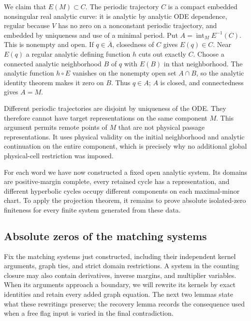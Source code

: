 We claim that $E(M)\subset C$.  The periodic trajectory $C$ is a
compact embedded nonsingular real analytic curve: it is analytic
by analytic ODE dependence, regular because $V$ has no zero on a
nonconstant periodic trajectory, and embedded by uniqueness and
use of a minimal period.  Put
$A=\operatorname{int}_M E^{-1}(C)$.  This is nonempty and open.
If $q\in\overline A$, closedness of $C$ gives $E(q)\in C$.
Near $E(q)$ a regular analytic defining function $h$ cuts out
exactly $C$.  Choose a connected analytic neighborhood $B$ of $q$
with $E(B)$ in that neighborhood.  The analytic function $h\circ E$
vanishes on the nonempty open set $A\cap B$, so the analytic
identity theorem makes it zero on $B$.  Thus $q\in A$; $A$ is
closed, and connectedness gives $A=M$.

Different periodic trajectories are disjoint by uniqueness of the
ODE.  They therefore cannot have target representations on the
same component $M$.  This argument permits remote points of $M$
that are not physical passage representations.  It uses physical
validity on the initial neighborhood and analytic continuation on
the entire component, which is precisely why no additional global
physical-cell restriction was imposed.

For each word we have now constructed a fixed open analytic system.
Its domains are positive-margin complete, every retained cycle has a
representation, and different hyperbolic cycles occupy different
components on each maximal-minor chart.  To apply the projection theorem,
it remains to prove absolute isolated-zero finiteness for every finite
system generated from these data.

\subsection{Absolute zeros of the matching systems}

Fix the matching systems just constructed, including their independent
kernel arguments, graph ties, and strict domain restrictions.  A system
in the counting closure may also contain derivatives, inverse margins,
and multiplier variables.  When its arguments approach a boundary, we
will rewrite its kernels by exact identities and retain every added
graph equation.  The next two lemmas state what these rewritings preserve;
the recovery lemma records the consequence used when a free flag input
is varied in the final contradiction.

